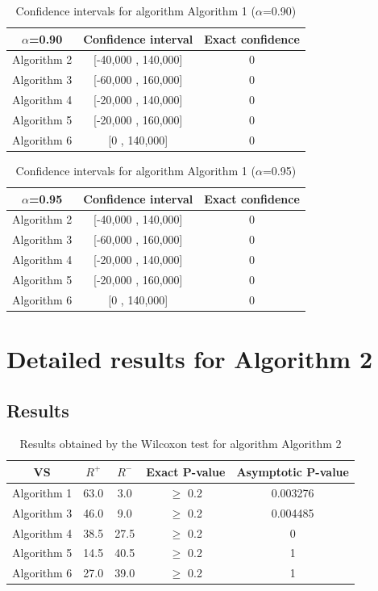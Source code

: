 \documentclass[a4paper,10pt]{article}
\begin{document}
\begin{table}[!htp]
\centering\small
\begin{tabular}{
|c|c|c|}
\hline
 $\alpha$=0.90 & Confidence interval & Exact confidence \\ \hline 
Algorithm 2 & [-40,000 , 140,000] & 0\\ \hline 
Algorithm 3 & [-60,000 , 160,000] & 0\\ \hline 
Algorithm 4 & [-20,000 , 140,000] & 0\\ \hline 
Algorithm 5 & [-20,000 , 160,000] & 0\\ \hline 
Algorithm 6 & [0 , 140,000] & 0\\ \hline 

\end{tabular}
\caption{Confidence intervals for algorithm Algorithm 1 ($\alpha$=0.90)}
\end{table}
\begin{table}[!htp]
\centering\small
\begin{tabular}{
|c|c|c|}
\hline
 $\alpha$=0.95 & Confidence interval & Exact confidence \\ \hline 
Algorithm 2 & [-40,000 , 140,000] & 0\\ \hline 
Algorithm 3 & [-60,000 , 160,000] & 0\\ \hline 
Algorithm 4 & [-20,000 , 140,000] & 0\\ \hline 
Algorithm 5 & [-20,000 , 160,000] & 0\\ \hline 
Algorithm 6 & [0 , 140,000] & 0\\ \hline 

\end{tabular}
\caption{Confidence intervals for algorithm Algorithm 1 ($\alpha$=0.95)}
\end{table}

 \clearpage 


\section{Detailed results for Algorithm 2}


\subsection{Results}

\begin{table}[!htp]
\centering\small
\begin{tabular}{
|c|c|c|c|c|}
\hline
 VS & $R^{+}$ & $R^{-}$ & Exact P-value & Asymptotic P-value \\ \hline 
Algorithm 1 & 63.0 & 3.0 & $\geq$ 0.2 & 0.003276\\ \hline 
Algorithm 3 & 46.0 & 9.0 & $\geq$ 0.2 & 0.004485\\ \hline 
Algorithm 4 & 38.5 & 27.5 & $\geq$ 0.2 & 0\\ \hline 
Algorithm 5 & 14.5 & 40.5 & $\geq$ 0.2 & 1\\ \hline 
Algorithm 6 & 27.0 & 39.0 & $\geq$ 0.2 & 1\\ \hline 

\end{tabular}
\caption{Results obtained by the Wilcoxon test for algorithm Algorithm 2}
\end{table}
\end{document}
